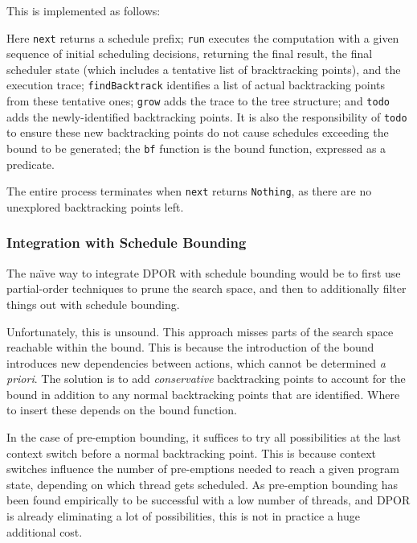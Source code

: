 This is implemented as follows:


Here \verb|next| returns a schedule prefix; \verb|run| executes the
computation with a given sequence of initial scheduling decisions,
returning the final result, the final scheduler state (which includes
a tentative list of bracktracking points), and the execution trace;
\verb|findBacktrack| identifies a list of actual backtracking points
from these tentative ones; \verb|grow| adds the trace to the tree
structure; and \verb|todo| adds the newly-identified backtracking
points. It is also the responsibility of \verb|todo| to ensure these
new backtracking points do not cause schedules exceeding the bound to
be generated; the \verb|bf| function is the bound function, expressed
as a predicate.

The entire process terminates when \verb|next| returns \verb|Nothing|,
as there are no unexplored backtracking points left.

\subsubsection{Integration with Schedule Bounding}
\label{sec:sct-por-bounding}

The na\"{\i}ve way to integrate DPOR with schedule bounding would be
to first use partial-order techniques to prune the search space, and
then to additionally filter things out with schedule bounding.

Unfortunately, this is unsound. This approach misses parts of the
search space reachable within the bound. This is because the
introduction of the bound introduces new dependencies between actions,
which cannot be determined \emph{a priori}. The solution is to add
\emph{conservative} backtracking points to account for the bound in
addition to any normal backtracking points that are identified. Where
to insert these depends on the bound function.

In the case of pre-emption bounding, it suffices to try all
possibilities at the last context switch before a normal backtracking
point. This is because context switches influence the number of
pre-emptions needed to reach a given program state, depending on which
thread gets scheduled. As pre-emption bounding has been found
empirically to be successful with a low number of threads, and DPOR is
already eliminating a lot of possibilities, this is not in practice a
huge additional cost.

